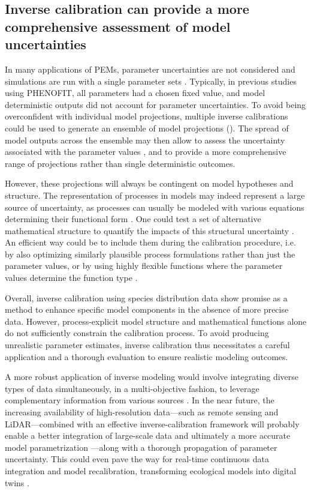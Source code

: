 \documentclass[preprint,12pt,authoryear]{elsarticle}
\begin{document}
{\subsection{Inverse calibration can provide a more comprehensive assessment of model uncertainties}

In many applications of PEMs, parameter uncertainties are not considered and simulations are run with a single parameter sets \citep{Niu2014, Lobell2010}. Typically, in previous studies using PHENOFIT, all parameters had a chosen fixed value, and model deterministic outputs did not account for parameter uncertainties. To avoid being overconfident with individual model projections, multiple inverse calibrations could be used to generate an ensemble of model projections (). The spread of model outputs across the ensemble may then allow to assess the uncertainty associated with the parameter values \citep{Simmonds2024}, and to provide a more comprehensive range of projections rather than single deterministic outcomes.

However, these projections will always be contingent on model hypotheses and structure. The representation of processes in models may indeed represent a large source of uncertainty, as processes can usually be modeled with various equations determining their functional form \citep{Keenan2011}. One could test a set of alternative mathematical structure to quantify the impacts of this structural uncertainty \citep{Huber2020}. An efficient way could be to include them during the calibration procedure, i.e. by also optimizing similarly plausible process formulations rather than just the parameter values, or by using highly flexible functions where the parameter values determine the function type \citep{Chuine2000}.

Overall, inverse calibration using species distribution data show promise as a method to enhance specific model components in the absence of more precise data. However, process-explicit model structure and mathematical functions alone do not sufficiently constrain the calibration process. To avoid producing unrealistic parameter estimates, inverse calibration thus necessitates a careful application and a thorough evaluation to ensure realistic modeling outcomes. 

A more robust application of inverse modeling would involve integrating diverse types of data simultaneously, in a multi-objective fashion, to leverage complementary information from various sources \citep{Cameron2022}. In the near future, the increasing availability of high-resolution data---such as remote sensing and LiDAR---combined with an effective inverse-calibration framework will probably enable a better integration of large-scale data and ultimately a more accurate model parametrization \textcolor{customred}{---along with a thorough propagation of parameter uncertainty.} This could even pave the way for real-time continuous data integration and model recalibration, transforming ecological models into digital twins \citep{Koning2023}.

}
\end{document}
